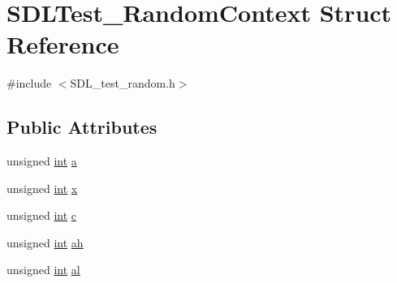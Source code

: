 \hypertarget{struct_s_d_l_test___random_context}{\section{S\-D\-L\-Test\-\_\-\-Random\-Context Struct Reference}
\label{struct_s_d_l_test___random_context}
}


{\ttfamily \#include $<$S\-D\-L\-\_\-test\-\_\-random.\-h$>$}

\subsection*{Public Attributes}
\begin{DoxyCompactItemize}
\item 
unsigned \hyperlink{_s_d_l__thread_8h_a6a64f9be4433e4de6e2f2f548cf3c08e}{int} \hyperlink{struct_s_d_l_test___random_context_a24f830d6cb476c96fbe325c99331e45f}{a}
\item 
unsigned \hyperlink{_s_d_l__thread_8h_a6a64f9be4433e4de6e2f2f548cf3c08e}{int} \hyperlink{struct_s_d_l_test___random_context_a8bd6d1b4e1677ed1c06f5cc09f1af5b6}{x}
\item 
unsigned \hyperlink{_s_d_l__thread_8h_a6a64f9be4433e4de6e2f2f548cf3c08e}{int} \hyperlink{struct_s_d_l_test___random_context_a17a6a7e7b68a33c67d9b74c8c7c33198}{c}
\item 
unsigned \hyperlink{_s_d_l__thread_8h_a6a64f9be4433e4de6e2f2f548cf3c08e}{int} \hyperlink{struct_s_d_l_test___random_context_a2c8d2f1ee16cdfd38361b8f03b3fdb85}{ah}
\item 
unsigned \hyperlink{_s_d_l__thread_8h_a6a64f9be4433e4de6e2f2f548cf3c08e}{int} \hyperlink{struct_s_d_l_test___random_context_a0e2bccd3611d383d6510c6c828aa54c4}{al}
\end{DoxyCompactItemize}


